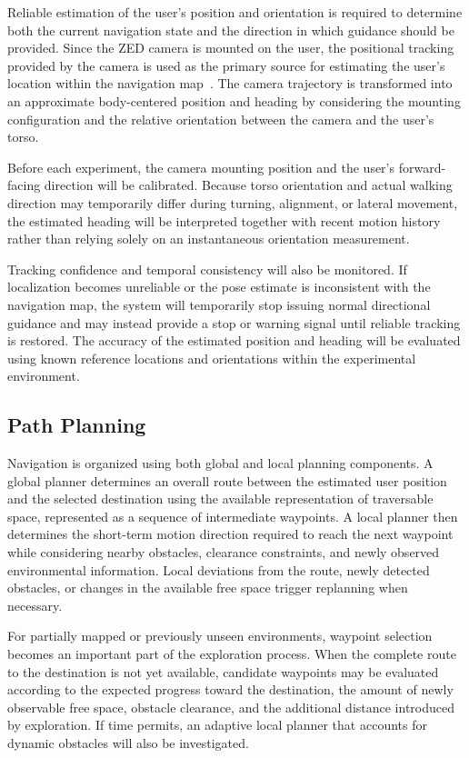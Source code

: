\documentclass[12pt]{report}
\begin{document}
Reliable estimation of the user's position and orientation is required to determine both the current navigation state and the direction in which guidance should be provided. Since the ZED camera is mounted on the user, the positional tracking provided by the camera is used as the primary source for estimating the user's location within the navigation map~\cite{zedtracking}. The camera trajectory is transformed into an approximate body-centered position and heading by considering the mounting configuration and the relative orientation between the camera and the user's torso.

Before each experiment, the camera mounting position and the user's forward-facing direction will be calibrated. Because torso orientation and actual walking direction may temporarily differ during turning, alignment, or lateral movement, the estimated heading will be interpreted together with recent motion history rather than relying solely on an instantaneous orientation measurement.

Tracking confidence and temporal consistency will also be monitored. If localization becomes unreliable or the pose estimate is inconsistent with the navigation map, the system will temporarily stop issuing normal directional guidance and may instead provide a stop or warning signal until reliable tracking is restored. The accuracy of the estimated position and heading will be evaluated using known reference locations and orientations within the experimental environment.

\subsection*{Path Planning}

Navigation is organized using both global and local planning components. A global planner determines an overall route between the estimated user position and the selected destination using the available representation of traversable space, represented as a sequence of intermediate waypoints. A local planner then determines the short-term motion direction required to reach the next waypoint while considering nearby obstacles, clearance constraints, and newly observed environmental information. Local deviations from the route, newly detected obstacles, or changes in the available free space trigger replanning when necessary.

For partially mapped or previously unseen environments, waypoint selection becomes an important part of the exploration process. When the complete route to the destination is not yet available, candidate waypoints may be evaluated according to the expected progress toward the destination, the amount of newly observable free space, obstacle clearance, and the additional distance introduced by exploration. If time permits, an adaptive local planner that accounts for dynamic obstacles will also be investigated.
\end{document}

